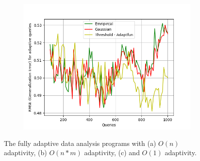 {\begin{figure}
\begin{subfigure}{.32\textwidth}
\begin{centering}
\includegraphics[width=1.0\textwidth]{c_adaptivity.png}
\caption{}
\end{centering}
\end{subfigure}
\vspace{-0.2cm}
 \caption{The fully adaptive data analysis programs with
 (a) $O(n)$ adaptivity, 
 (b) $O(n*m)$ adaptivity,
 (c) and $O(1)$ adaptivity.
}
\label{fig:implementation_generalization_errors}
\vspace{-0.6cm}
\end{figure}
}
